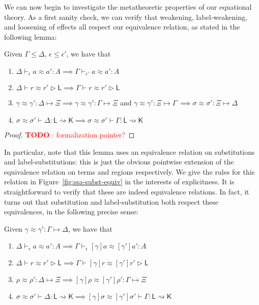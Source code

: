 \documentclass[acmsmall,screen,review]{acmart}
\newcounter{todos}
\newcommand{\todo}[1]{\stepcounter{todos} \textcolor{red}{\textbf{TODO \arabic{todos}}: #1}}
\newcommand{\ms}[1]{\ensuremath{\mathsf{#1}}}
\newcommand{\issubst}[3]{#1: #2 \mapsto #3}
\newcommand{\lbsubst}[4]{#1 \vdash #2: #3 \rightsquigarrow #4}
\newcommand{\teqv}{\approx}
\newcommand{\tmeq}[5]{#1 \vdash_{#2} #3 \teqv #4 : {#5}}
\newcommand{\lbeq}[4]{#1 \vdash #2 \teqv #3 \rhd {#4}}
\newcommand{\tmseq}[4]{\issubst{#1 \teqv #2}{#3}{#4}}
\newcommand{\lbseq}[5]{\lbsubst{#1 \teqv #2}{#3}{#4}{#5}}
\begin{document}
We can now begin to investigate the metatheoretic properties of our equational theory. As a first
sanity check, we can verify that weakening, label-weakening, and loosening of effects all respect
our equivalence relation, as stated in the following lemma:
\begin{lemma}
  Given $\Gamma \leq \Delta$, $\epsilon \leq \epsilon'$, we have that
  \begin{enumerate}[label=(\alph*)]
    \item $\tmeq{\Delta}{\epsilon}{a}{a'}{A} \implies \tmeq{\Gamma}{\epsilon'}{a}{a'}{A}$
    \item $\lbeq{\Delta}{r}{r'}{\ms{L}} \implies \lbeq{\Gamma}{r}{r'}{\ms{L}}$
    \item $\tmseq{\gamma}{\gamma'}{\Delta}{\Xi} 
      \implies \tmseq{\gamma}{\gamma'}{\Gamma}{\Xi}$ and
      $\tmseq{\gamma}{\gamma'}{\Xi}{\Gamma}\
      \implies \tmseq{\sigma}{\sigma'}{\Xi}{\Delta}$
    \item $\lbseq{\sigma}{\sigma'}{\Delta}{\ms{L}}{\ms{K}}
      \implies \lbseq{\sigma}{\sigma'}{\Gamma}{\ms{L}}{\ms{K}}$
  \end{enumerate}
\end{lemma}
\begin{proof}
  \todo{formalization pointer?}
\end{proof}
In particular, note that this lemma uses an equivalence relation on substitutions and
label-substitutions: this is just the obvious pointwise extension of the equivalence relation on
terms and regions respectively. We give the rules for this relation in
Figure~\ref{fig:ssa-subst-equiv} in the interests of explicitness. It is straightforward to verify
that these are indeed equivalence relations.  In fact, it turns out that substitution and
label-substitution both respect these equivalences, in the following precise sense:
\begin{lemma}
  Given $\tmseq{\gamma}{\gamma'}{\Gamma}{\Delta}$, we have that
  \begin{enumerate}[label=(\alph*)]
    \item $\tmeq{\Delta}{\epsilon}{a}{a'}{A} 
      \implies \tmeq{\Gamma}{\epsilon}{[\gamma]a}{[\gamma']a'}{A}$
    \item $\lbeq{\Delta}{r}{r'}{\ms{L}} 
      \implies \lbeq{\Gamma}{[\gamma]r}{[\gamma']r'}{\ms{L}}$
    \item $\tmseq{\rho}{\rho'}{\Delta}{\Xi}
      \implies \tmseq{[\gamma]\rho}{[\gamma']\rho'}{\Gamma}{\Xi}$
    \item $\lbseq{\sigma}{\sigma'}{\Delta}{\ms{L}}{\ms{K}}
      \implies \lbseq{[\gamma]\sigma}{[\gamma']\sigma'}{\Gamma}{\ms{L}}{\ms{K}}$
  \end{enumerate}
\end{lemma}
\end{document}
